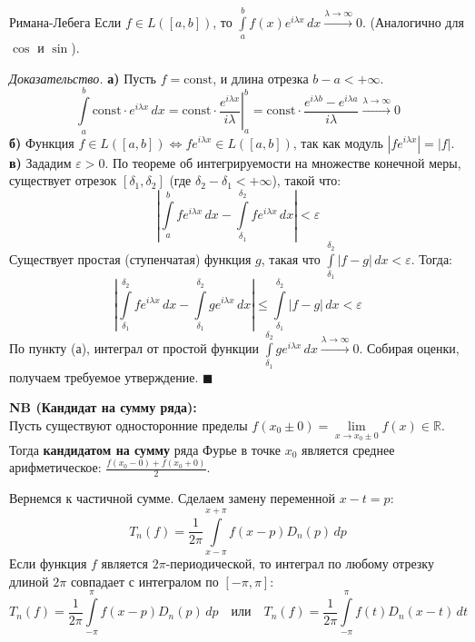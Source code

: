\documentclass[12pt,a4paper]{article}
\newenvironment{Proof}[1][Доказательство]{\vspace{0.5em}\noindent\textit{#1.}\hspace{0.5em}\ignorespaces}{\hfill$\blacksquare$\vspace{1em}}
\begin{document}
\begin{Lemma}{Римана-Лебега}{}
Если $f \in L([a, b])$, то $\int\limits_a^b f(x) e^{i\lambda x} \, dx \xrightarrow{\lambda \to \infty} 0$. (Аналогично для $\cos$ и $\sin$).
\end{Lemma}

\begin{Proof}
\textbf{а)} Пусть $f = \text{const}$, и длина отрезка $b-a < +\infty$.
$$ \int\limits_a^b \text{const} \cdot e^{i\lambda x} \, dx = \text{const} \cdot \left. \frac{e^{i\lambda x}}{i\lambda} \right|_a^b = \text{const} \cdot \frac{e^{i\lambda b} - e^{i\lambda a}}{i\lambda} \xrightarrow{\lambda \to \infty} 0 $$
\textbf{б)} Функция $f \in L([a,b]) \iff f e^{i\lambda x} \in L([a,b])$, так как модуль $|f e^{i\lambda x}| = |f|$. \\
\textbf{в)} Зададим $\varepsilon > 0$. По теореме об интегрируемости на множестве конечной меры, существует отрезок $[\delta_1, \delta_2]$ (где $\delta_2 - \delta_1 < +\infty$), такой что:
$$ \left| \int\limits_a^b f e^{i\lambda x} \, dx - \int\limits_{\delta_1}^{\delta_2} f e^{i\lambda x} \, dx \right| < \varepsilon $$
Существует простая (ступенчатая) функция $g$, такая что $\int\limits_{\delta_1}^{\delta_2} |f - g| \, dx < \varepsilon$. Тогда:
$$ \left| \int\limits_{\delta_1}^{\delta_2} f e^{i\lambda x} \, dx - \int\limits_{\delta_1}^{\delta_2} g e^{i\lambda x} \, dx \right| \le \int\limits_{\delta_1}^{\delta_2} |f - g| \, dx < \varepsilon $$
По пункту (а), интеграл от простой функции $\int\limits_{\delta_1}^{\delta_2} g e^{i\lambda x} \, dx \xrightarrow{\lambda \to \infty} 0$. Собирая оценки, получаем требуемое утверждение.
\end{Proof}

\noindent \textbf{NB (Кандидат на сумму ряда):} \\
Пусть существуют односторонние пределы $f(x_0 \pm 0) = \lim\limits_{x \to x_0 \pm 0} f(x) \in \mathbb{R}$. \\
Тогда \textbf{кандидатом на сумму} ряда Фурье в точке $x_0$ является среднее арифметическое: $\frac{f(x_0 - 0) + f(x_0 + 0)}{2}$.

Вернемся к частичной сумме. Сделаем замену переменной $x - t = p$:
$$ T_n(f) = \frac{1}{2\pi} \int\limits_{x-\pi}^{x+\pi} f(x-p) D_n(p) \, dp $$
Если функция $f$ является $2\pi$-периодической, то интеграл по любому отрезку длиной $2\pi$ совпадает с интегралом по $[-\pi, \pi]$:
$$ T_n(f) = \frac{1}{2\pi} \int\limits_{-\pi}^\pi f(x-p) D_n(p) \, dp \quad \text{или} \quad T_n(f) = \frac{1}{2\pi} \int\limits_{-\pi}^\pi f(t) D_n(x-t) \, dt $$
\end{document}
